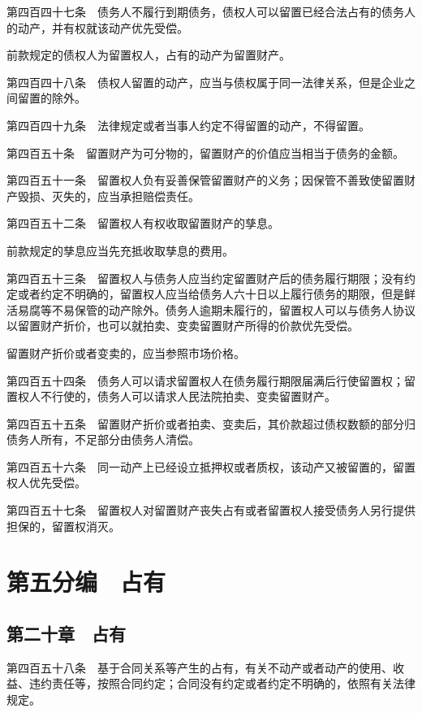 \documentclass[UTF8,12pt,a4paper]{ctexbook}
\begin{document}
第四百四十七条　债务人不履行到期债务，债权人可以留置已经合法占有的债务人的动产，并有权就该动产优先受偿。

前款规定的债权人为留置权人，占有的动产为留置财产。

第四百四十八条　债权人留置的动产，应当与债权属于同一法律关系，但是企业之间留置的除外。

第四百四十九条　法律规定或者当事人约定不得留置的动产，不得留置。

第四百五十条　留置财产为可分物的，留置财产的价值应当相当于债务的金额。

第四百五十一条　留置权人负有妥善保管留置财产的义务；因保管不善致使留置财产毁损、灭失的，应当承担赔偿责任。

第四百五十二条　留置权人有权收取留置财产的孳息。

前款规定的孳息应当先充抵收取孳息的费用。

第四百五十三条　留置权人与债务人应当约定留置财产后的债务履行期限；没有约定或者约定不明确的，留置权人应当给债务人六十日以上履行债务的期限，但是鲜活易腐等不易保管的动产除外。债务人逾期未履行的，留置权人可以与债务人协议以留置财产折价，也可以就拍卖、变卖留置财产所得的价款优先受偿。

留置财产折价或者变卖的，应当参照市场价格。

第四百五十四条　债务人可以请求留置权人在债务履行期限届满后行使留置权；留置权人不行使的，债务人可以请求人民法院拍卖、变卖留置财产。

第四百五十五条　留置财产折价或者拍卖、变卖后，其价款超过债权数额的部分归债务人所有，不足部分由债务人清偿。

第四百五十六条　同一动产上已经设立抵押权或者质权，该动产又被留置的，留置权人优先受偿。

第四百五十七条　留置权人对留置财产丧失占有或者留置权人接受债务人另行提供担保的，留置权消灭。


\cleardoublepage
{}
\chapter*{第五分编　占有}

\section*{第二十章　占有}

第四百五十八条　基于合同关系等产生的占有，有关不动产或者动产的使用、收益、违约责任等，按照合同约定；合同没有约定或者约定不明确的，依照有关法律规定。
\end{document}
